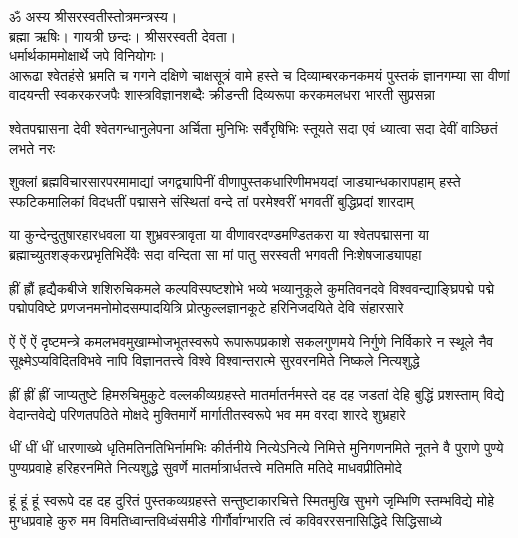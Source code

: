 
\setlength{\shlokaspaceskip}{12pt}
ॐ अस्य श्रीसरस्वतीस्तोत्रमन्त्रस्य।\\
ब्रह्मा ऋषिः। गायत्री छन्दः। श्रीसरस्वती देवता।\\
धर्मार्थकाममोक्षार्थे जपे विनियोगः।\\

\fourlineindentedshloka
{आरूढा श्वेतहंसे भ्रमति च गगने दक्षिणे चाक्षसूत्रं}
{वामे हस्ते च दिव्याम्बरकनकमयं पुस्तकं ज्ञानगम्या}
{सा वीणां वादयन्ती स्वकरकरजपैः शास्त्रविज्ञानशब्दैः}
{क्रीडन्ती दिव्यरूपा करकमलधरा भारती सुप्रसन्ना}

\threelineshloka
{श्वेतपद्मासना देवी श्वेतगन्धानुलेपना}
{अर्चिता मुनिभिः सर्वैरृषिभिः स्तूयते सदा}
{एवं ध्यात्वा सदा देवीं वाञ्छितं लभते नरः}

\fourlineindentedshloka
{शुक्लां ब्रह्मविचारसारपरमामाद्यां जगद्व्यापिनीं}
{वीणापुस्तकधारिणीमभयदां जाड्यान्धकारापहाम्}
{हस्ते स्फटिकमालिकां विदधतीं पद्मासने संस्थितां}
{वन्दे तां परमेश्वरीं भगवतीं बुद्धिप्रदां शारदाम्}

\fourlineindentedshloka
{या कुन्देन्दुतुषारहारधवला या शुभ्रवस्त्रावृता}
{या वीणावरदण्डमण्डितकरा या श्वेतपद्मासना}
{या ब्रह्माच्युतशङ्करप्रभृतिभिर्देवैः सदा वन्दिता}
{सा मां पातु सरस्वती भगवती निःशेषजाड्यापहा}

\fourlineindentedshloka
{ह्रीं ह्रौं हृद्यैकबीजे शशिरुचिकमले कल्पविस्पष्टशोभे}
{भव्ये भव्यानुकूले कुमतिवनदवे विश्ववन्द्याङ्घ्रिपद्मे}
{पद्मे पद्मोपविष्टे प्रणजनमनोमोदसम्पादयित्रि}
{प्रोत्फुल्लज्ञानकूटे हरिनिजदयिते देवि संहारसारे}

\fourlineindentedshloka
{ऐं ऐं ऐं दृष्टमन्त्रे कमलभवमुखाम्भोजभूतस्वरूपे}
{रूपारूपप्रकाशे सकलगुणमये निर्गुणे निर्विकारे}
{न स्थूले नैव सूक्ष्मेऽप्यविदितविभवे नापि विज्ञानतत्त्वे}
{विश्वे विश्वान्तरात्मे सुरवरनमिते निष्कले नित्यशुद्धे}

\fourlineindentedshloka
{ह्रीं ह्रीं ह्रीं जाप्यतुष्टे हिमरुचिमुकुटे वल्लकीव्यग्रहस्ते}
{मातर्मातर्नमस्ते दह दह जडतां देहि बुद्धिं प्रशस्ताम्}
{विद्ये वेदान्तवेद्ये परिणतपठिते मोक्षदे मुक्तिमार्गे}
{मार्गातीतस्वरूपे भव मम वरदा शारदे शुभ्रहारे}

\fourlineindentedshloka
{धीं धीं धीं धारणाख्ये धृतिमतिनतिभिर्नामभिः कीर्तनीये}
{नित्येऽनित्ये निमित्ते मुनिगणनमिते नूतने वै पुराणे}
{पुण्ये पुण्यप्रवाहे हरिहरनमिते नित्यशुद्धे सुवर्णे}
{मातर्मात्रार्धतत्त्वे मतिमति मतिदे माधवप्रीतिमोदे}

\fourlineindentedshloka
{हूं हूं हूं स्वरूपे दह दह दुरितं पुस्तकव्यग्रहस्ते}
{सन्तुष्टाकारचित्ते स्मितमुखि सुभगे जृम्भिणि स्तम्भविद्ये}
{मोहे मुग्धप्रवाहे कुरु मम विमतिध्वान्तविध्वंसमीडे}
{गीर्गौर्वाग्भारति त्वं कविवररसनासिद्धिदे सिद्धिसाध्ये}

